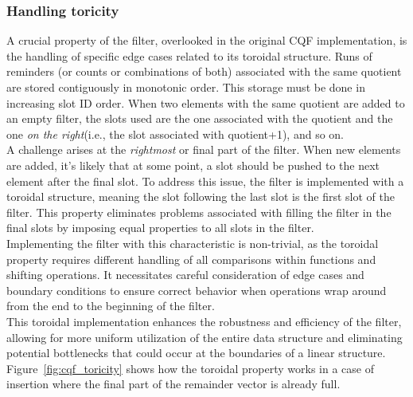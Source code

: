 \subsubsection{Handling toricity}
A crucial property of the filter, overlooked in the original CQF implementation, is the handling of specific edge cases related to its toroidal structure. Runs of reminders (or counts or combinations of both) associated with the same quotient are stored contiguously in monotonic order. This storage must be done in increasing slot ID order. When two elements with the same quotient are added to an empty filter, the slots used are the one associated with the quotient and the one \emph{on the right}(i.e., the slot associated with quotient+1), and so on.\\
A challenge arises at the \emph{rightmost} or final part of the filter. When new elements are added, it's likely that at some point, a slot should be pushed to the next element after the final slot. To address this issue, the filter is implemented with a toroidal structure, meaning the slot following the last slot is the first slot of the filter. This property eliminates problems associated with filling the filter in the final slots by imposing equal properties to all slots in the filter.\\
Implementing the filter with this characteristic is non-trivial, as the toroidal property requires different handling of all comparisons within functions and shifting operations. It necessitates careful consideration of edge cases and boundary conditions to ensure correct behavior when operations wrap around from the end to the beginning of the filter.\\
This toroidal implementation enhances the robustness and efficiency of the filter, allowing for more uniform utilization of the entire data structure and eliminating potential bottlenecks that could occur at the boundaries of a linear structure. Figure~\ref{fig:cqf_toricity} shows how the toroidal property works in a case of insertion where the final part of the remainder vector is already full.
